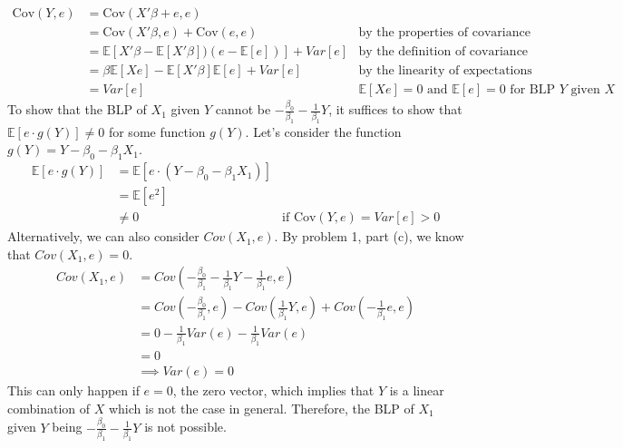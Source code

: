 \documentclass[10pt]{article}
\newcommand{\E}{\mathbb{E}}
\newenvironment{problem}[2][Problem]{\begin{trivlist}
\item[\hskip \labelsep {\bfseries #1}\hskip \labelsep {\bfseries #2.}]}{\end{trivlist}}
\begin{document}
\begin{problem}{2}
    \begin{align*}
        \text{Cov}(Y, e) &= \text{Cov}(X'\beta + e, e) & \\
                         &= \text{Cov}(X'\beta, e) + \text{Cov}(e, e) & \text{by the properties of covariance} \\
                         & = \E[X'\beta - \E[X'\beta])(e - \E[e])] + Var[e] & \text{by the definition of covariance} \\
                         &= \beta \E[Xe] - \E[X'\beta]\E[e] + Var[e] & \text{by the linearity of expectations} \\
                         &= Var[e] & \text{$\E[Xe] = 0$ and $\E[e] = 0$ for BLP $Y$ given $X$}
    \end{align*}
    To show that the BLP of $X_1$ given $Y$ cannot be $-\frac{\beta_0}{\beta_1} - \frac{1}{\beta_1}Y$, it suffices to show that $\E[e \cdot g(Y)] \neq 0$ for some function $g(Y)$. Let's consider the function $g(Y) = Y - \beta_0 - \beta_1 X_1$.
    \begin{align*}
        \E[e \cdot g(Y)] &= \E[e \cdot (Y - \beta_0 - \beta_1 X_1)] \\
                         &= \E[e^2] \\
                         &\neq 0 & \text{if $\text{Cov}(Y,e) = Var[e] > 0$}
    \end{align*}
    Alternatively, we can also consider $Cov(X_1, e)$. By problem 1, part (c), we know that $Cov(X_1, e) = 0$.
    \begin{align*}
        Cov(X_1, e) &= Cov(-\frac{\beta_0}{\beta_1} - \frac{1}{\beta_1}Y - \frac{1}{\beta_1}e, e) \\
                    &= Cov(-\frac{\beta_0}{\beta_1}, e) - Cov(\frac{1}{\beta_1}Y, e) + Cov(-\frac{1}{\beta_1}e, e) \\
                    &= 0 - \frac{1}{\beta_1}Var(e) - \frac{1}{\beta_1}Var(e) \\
                    &= 0 \\ 
                    & \implies Var(e) = 0
    \end{align*}
    This can only happen if $e = 0$, the zero vector, which implies that $Y$ is a linear combination of $X$ which is not the case in general.
    Therefore, the BLP of $X_1$ given $Y$ being $-\frac{\beta_0}{\beta_1} - \frac{1}{\beta_1}Y$ is not possible.
    \hfill
\end{problem}
\end{document}
